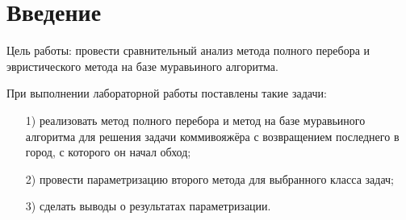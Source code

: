 \chapter*{Введение}
\label{cha:intro}
Цель работы: провести сравнительный анализ метода полного перебора и эвристического метода на базе муравьиного алгоритма.

При выполнении лабораторной работы поставлены такие задачи:
\begin{enumerate}
	\item[1)] реализовать метод полного перебора и метод на базе муравьиного алгоритма для решения задачи коммивояжёра с возвращением последнего в город, с которого он начал обход;
	\item[2)] провести параметризацию второго метода для выбранного класса задач;
	\item[3)] сделать выводы о результатах параметризации.
\end{enumerate}
